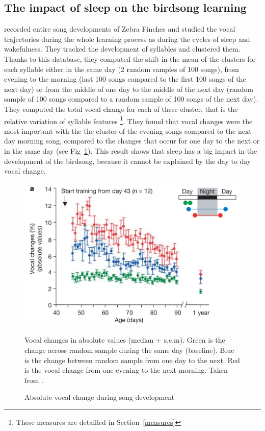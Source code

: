 \documentclass{report}
\begin{document}
\subsection{The impact of sleep on the birdsong learning}
\label{impact-sleep-birdsong-learning}

\textcite{deregnaucourt_how_2005} recorded entire song developments of Zebra
Finches and studied the vocal trajectories during the whole learning process as
during the cycles of sleep and wakefulness. They tracked the development of
syllables and clustered them. Thanks to this database, they computed the shift
in the mean of the clusters for each syllable either in the same day (2 random
samples of 100 songs), from evening to the morning (last 100 songs compared to
the first 100 songs of the next day) or from the middle of one day to the middle
of the next day (random sample of 100 songs compared to a random sample of 100
songs of the next day). They computed the total vocal change for each of these
cluster, that is the relative variation of syllable features
\textcite{tchernichovski_procedure_2000}\footnote{These measures are detailled
in Section~\ref{measures}}. They found that vocal changes were the most
important with the the cluster of the evening songs compared to the next day
morning song, compared to the changes that occur for one day to the next or in
the same day (see Fig~\ref{der_abs_vocal_change}). This result shows that sleep
has a big impact in the development of the birdsong, because it cannot be
explained by the day to day vocal change.

\begin{figure}[htpb]
  {\center
  \includegraphics[width=0.7\linewidth]{media/der_absolute_vocal_change}
  \caption{Absolute vocal change during song development\label{der_abs_vocal_change}}}
  \small
  Vocal changes in absolute values (median + s.e.m). Green is the change across random sample during the same day (baseline). Blue is the change between random sample from one day to the next. Red is the vocal change from one evening to the next morning. Taken from \textcite{deregnaucourt_how_2005}.
\end{figure}
\end{document}
